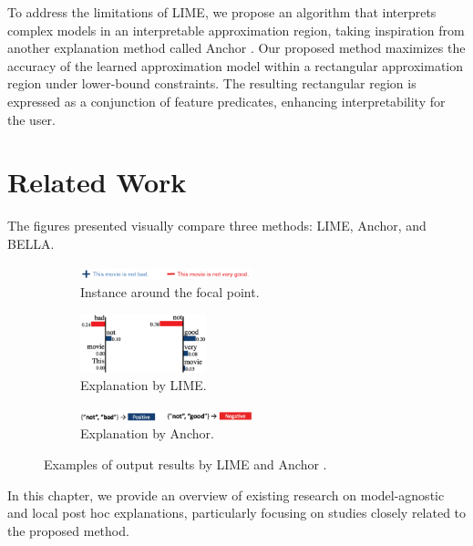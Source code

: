 \documentclass[runningheads]{llncs}
\begin{document}
To address the limitations of LIME,
we propose an algorithm that interprets complex models
in an interpretable approximation region,
taking inspiration from another explanation method called Anchor
\cite{ribeiro2018anchors}.
Our proposed method maximizes the accuracy of the learned approximation model
within a rectangular approximation region under lower-bound constraints.
The resulting rectangular region is expressed as a conjunction of feature predicates,
enhancing interpretability for the user.

\section{Related Work}
The figures presented visually compare three methods: LIME, Anchor, and BELLA.

\begin{figure}[t]
  \vspace{0.5cm}
  \begin{subfigure}[t]{\textwidth}
    \centering
    \includegraphics[width=0.55\textwidth]{lime_vs_anchor_exp_a.png}
    \caption{Instance around the focal point.}\label{fig:lime_vs_anchor_exp_a}
    \vspace{0.5cm}
  \end{subfigure}
  \hfill
  \begin{subfigure}[t]{\textwidth}
    \centering
    \includegraphics[width=0.4\textwidth]{lime_vs_anchor_exp_b.png}
    \caption{Explanation by LIME.}\label{fig:lime_vs_anchor_exp_b}
    \vspace{0.5cm}
  \end{subfigure}
  \begin{subfigure}[t]{\textwidth}
    \centering
    \includegraphics[width=0.55\textwidth]{lime_vs_anchor_exp_c.png}
    \caption{Explanation by Anchor.}\label{fig:lime_vs_anchor_exp_c}
  \end{subfigure}
  \caption[Examples of output results by LIME and Anchor]{Examples of output results by LIME and Anchor \cite{ribeiro2018anchors}.}\label{fig:lime_vs_anchor_exp}
\end{figure}
In this chapter, we provide an overview of existing research on model-agnostic and local post hoc explanations, particularly focusing on studies closely related to the proposed method.
\end{document}
